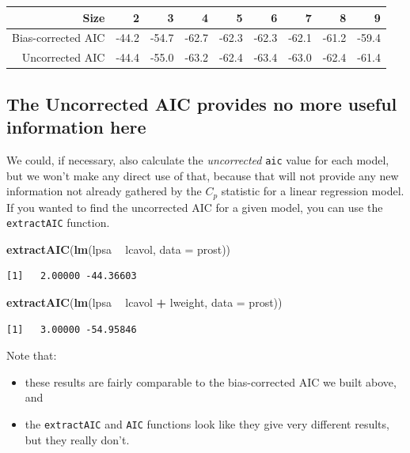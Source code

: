 \documentclass[]{book}
\newenvironment{Shaded}{\begin{snugshade}}{\end{snugshade}}
\newcommand{\KeywordTok}[1]{\textcolor[rgb]{0.13,0.29,0.53}{\textbf{#1}}}
\newcommand{\DataTypeTok}[1]{\textcolor[rgb]{0.13,0.29,0.53}{#1}}
\newcommand{\StringTok}[1]{\textcolor[rgb]{0.31,0.60,0.02}{#1}}
\newcommand{\OperatorTok}[1]{\textcolor[rgb]{0.81,0.36,0.00}{\textbf{#1}}}
\newcommand{\NormalTok}[1]{#1}
\providecommand{\tightlist}{%
  \setlength{\itemsep}{0pt}\setlength{\parskip}{0pt}}
\theoremstyle{definition}
\theoremstyle{definition}
\theoremstyle{definition}
\theoremstyle{remark}
\begin{document}
\begin{longtable}[]{@{}rrrrrrrrr@{}}
\toprule
Size & 2 & 3 & 4 & 5 & 6 & 7 & 8 & 9\tabularnewline
\midrule
\endhead
Bias-corrected AIC & -44.2 & -54.7 & -62.7 & -62.3 & -62.3 & -62.1 &
-61.2 & -59.4\tabularnewline
Uncorrected AIC & -44.4 & -55.0 & -63.2 & -62.4 & -63.4 & -63.0 & -62.4
& -61.4\tabularnewline
\bottomrule
\end{longtable}

\subsection{The Uncorrected AIC provides no more useful information
here}\label{the-uncorrected-aic-provides-no-more-useful-information-here}

We could, if necessary, also calculate the \emph{uncorrected}
\texttt{aic} value for each model, but we won't make any direct use of
that, because that will not provide any new information not already
gathered by the \(C_p\) statistic for a linear regression model. If you
wanted to find the uncorrected AIC for a given model, you can use the
\texttt{extractAIC} function.

\begin{Shaded}
\begin{Highlighting}[]
\KeywordTok{extractAIC}\NormalTok{(}\KeywordTok{lm}\NormalTok{(lpsa }\OperatorTok{~}\StringTok{ }\NormalTok{lcavol, }\DataTypeTok{data =}\NormalTok{ prost))}
\end{Highlighting}
\end{Shaded}

\begin{verbatim}
[1]   2.00000 -44.36603
\end{verbatim}

\begin{Shaded}
\begin{Highlighting}[]
\KeywordTok{extractAIC}\NormalTok{(}\KeywordTok{lm}\NormalTok{(lpsa }\OperatorTok{~}\StringTok{ }\NormalTok{lcavol }\OperatorTok{+}\StringTok{ }\NormalTok{lweight, }\DataTypeTok{data =}\NormalTok{ prost))}
\end{Highlighting}
\end{Shaded}

\begin{verbatim}
[1]   3.00000 -54.95846
\end{verbatim}

Note that:

\begin{itemize}
\tightlist
\item
  these results are fairly comparable to the bias-corrected AIC we built
  above, and
\item
  the \texttt{extractAIC} and \texttt{AIC} functions look like they give
  very different results, but they really don't.
\end{itemize}
\end{document}
